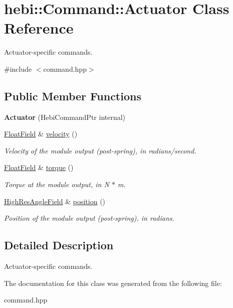 \hypertarget{classhebi_1_1Command_1_1Actuator}{}\section{hebi\+:\+:Command\+:\+:Actuator Class Reference}
\label{classhebi_1_1Command_1_1Actuator}


Actuator-\/specific commands.  




{\ttfamily \#include $<$command.\+hpp$>$}

\subsection*{Public Member Functions}
\begin{DoxyCompactItemize}
\item 
\mbox{\label{classhebi_1_1Command_1_1Actuator_afe321b7e8cee804d45241b64a26fe05d}} 
{\bfseries Actuator} (Hebi\+Command\+Ptr internal)
\item 
\mbox{\label{classhebi_1_1Command_1_1Actuator_a9f9a807011bd53ba8bc9077fc6da36c6}} 
\hyperlink{classhebi_1_1Command_1_1FloatField}{Float\+Field} \& \hyperlink{classhebi_1_1Command_1_1Actuator_a9f9a807011bd53ba8bc9077fc6da36c6}{velocity} ()
\begin{DoxyCompactList}\small\item\em Velocity of the module output (post-\/spring), in radians/second. \end{DoxyCompactList}\item 
\mbox{\label{classhebi_1_1Command_1_1Actuator_aff547c7a88a7cfa613bdbd03ed19bbdd}} 
\hyperlink{classhebi_1_1Command_1_1FloatField}{Float\+Field} \& \hyperlink{classhebi_1_1Command_1_1Actuator_aff547c7a88a7cfa613bdbd03ed19bbdd}{torque} ()
\begin{DoxyCompactList}\small\item\em Torque at the module output, in N $\ast$ m. \end{DoxyCompactList}\item 
\mbox{\label{classhebi_1_1Command_1_1Actuator_a8ef2c47dd77981bed74b580b5832489e}} 
\hyperlink{classhebi_1_1Command_1_1HighResAngleField}{High\+Res\+Angle\+Field} \& \hyperlink{classhebi_1_1Command_1_1Actuator_a8ef2c47dd77981bed74b580b5832489e}{position} ()
\begin{DoxyCompactList}\small\item\em Position of the module output (post-\/spring), in radians. \end{DoxyCompactList}\end{DoxyCompactItemize}


\subsection{Detailed Description}
Actuator-\/specific commands. 

The documentation for this class was generated from the following file\+:\begin{DoxyCompactItemize}
\item 
command.\+hpp\end{DoxyCompactItemize}
